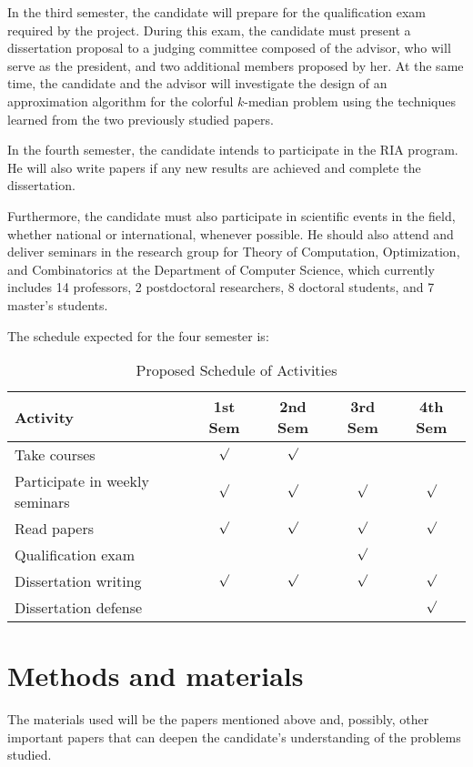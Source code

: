 \documentclass[12pt]{article}
\begin{document}
In the third semester, the candidate will prepare for the qualification exam required by the project. 
During this exam, the candidate must present a dissertation proposal to a judging committee composed of the advisor, who will serve as the president, and two additional members proposed by her.
At the same time, the candidate and the advisor will investigate the design of an approximation algorithm for the colorful $k$-median problem using the techniques learned from the two previously studied papers.

In the fourth semester, the candidate intends to participate in the RIA program.
He will also write papers if any new results are achieved and complete the dissertation.

Furthermore, the candidate must also participate in scientific events in the field, whether national or international, whenever possible. He should also attend and deliver seminars in the research group for Theory of Computation, Optimization, and Combinatorics at the Department of Computer Science, which currently includes 14 professors, 2 postdoctoral researchers, 8 doctoral students, and 7 master's students.

The schedule expected for the four semester is:

\begin{table}[ht]
\centering
\begin{tabular}{|l|c|c|c|c|}
\hline
\textbf{Activity} & \textbf{1st Sem} & \textbf{2nd Sem} & \textbf{3rd Sem} & \textbf{4th Sem} \\
\hline
Take courses                  & \(\surd\) & \(\surd\) &        &        \\
Participate in weekly seminars & \(\surd\) & \(\surd\) & \(\surd\) & \(\surd\) \\
Read papers           & \(\surd\) & \(\surd\) & \(\surd\) &   \(\surd\)     \\
Qualification exam            &          &          & \(\surd\) &        \\
Dissertation writing          &   \(\surd\)       &    \(\surd\)      & \(\surd\) & \(\surd\) \\
Dissertation defense          &          &          &          & \(\surd\) \\
\hline
\end{tabular}
\caption{Proposed Schedule of Activities}
\end{table}

\section{Methods and materials}
The materials used will be the papers mentioned above and, possibly, other important papers that can deepen the candidate's understanding of the problems studied.
\end{document}
